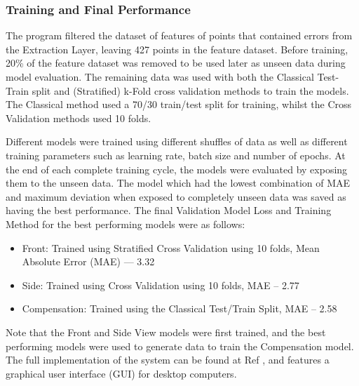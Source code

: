 \documentclass[conference]{IEEEtran}
\begin{document}
\subsubsection{Training and Final Performance} \label{trainingandperformance}
The program filtered the dataset of features of points that contained errors from the Extraction Layer, leaving 427 points in the feature dataset.
Before training, 20\% of the feature dataset was removed to be used later as unseen data during model evaluation.
The remaining data was used with both the Classical Test-Train split and (Stratified) k-Fold cross validation methods to train the models.
The Classical method used a 70/30 train/test split for training, whilst the Cross Validation methods used 10 folds.

Different models were trained using different shuffles of data as well as different training parameters such as learning rate, batch size and number of epochs.
At the end of each complete training cycle, the models were evaluated by exposing them to the unseen data.
The model which had the lowest combination of MAE and maximum deviation when exposed to completely unseen data was saved as having the best performance.
The final Validation Model Loss and Training Method for the best performing models were as follows:
\begin{itemize}
\item Front: Trained using Stratified Cross Validation using 10 folds, Mean Absolute Error (MAE) — 3.32
\item Side: Trained using Cross Validation using 10 folds, MAE -- 2.77
\item Compensation: Trained using the Classical Test/Train Split, MAE -- 2.58
\end{itemize}
Note that the Front and Side View models were first trained, and the best performing models were used to generate data to train the Compensation model.
The full implementation of the system can be found at Ref \cite{repo}, and features a graphical user interface (GUI) for desktop computers.
\end{document}
